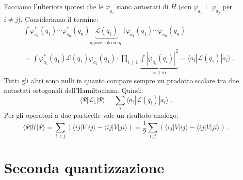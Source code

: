 \documentclass[12pt,a4paper]{report}
\theoremstyle{definition}
\newcommand{\lag}{\mathcal{L}}
\numberwithin{equation}{section}
\newcommand{\bra}{\langle}
\newcommand{\ket}{\rangle}
\begin{document}
Facciamo l'ulteriore ipotesi che le $\varphi_{a_i}$ siano autostati di $H$ (con $\varphi_{a_i}\perp\varphi_{a_j}$ per $i\ne j$). Consideriamo il termine:
\begin{align*}
&\int \varphi_{a_1}^*(q_1)\cdots\varphi_{a_n}^*(q_n)\underbrace{\lag(q_1)}_{\mbox{agisce solo su}\; q_1}(\varphi_{a_1}(q_1)\cdots\varphi_{a_n}(q_n) \\
&= \int \varphi_{a_1}^*(q_1)\lag(q_1)\varphi_{a_1}(q_1)\cdot\prod_{i\ne 1}\underbrace{\int|\varphi_{a_i}(q_i)|^2}_{=1\;\forall i}=\bra a_i|\lag(q_1)|a_i\ket\;.
\end{align*}
Tutti gli altri sono nulli in quanto compare sempre un prodotto scalare tra due autostati ortogonali dell'Hamiltoniana. Quindi:
\begin{equation}
\bra\Psi|\lag_1|\Psi\ket=\sum_i\bra a_i|\lag(q_i)|a_i\ket\;.
\end{equation}
Per gli operatori a due particelle vale un risultato analogo:
\begin{equation}
\bra\Psi|\mathcal{U}|\Psi\ket=\sum_{i<j}(\bra ij|V|ij\ket-\bra ij|V|ji\ket)=\frac{1}{2}\sum_{i,j}(\bra ij|V|ij\ket-\bra ij|V|ji\ket)\;.
\end{equation}
\chapter{Seconda quantizzazione}
\end{document}
